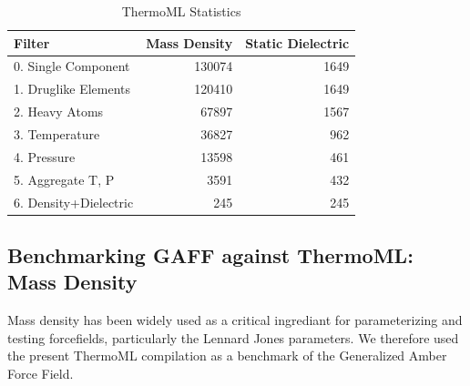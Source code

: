 \documentclass[journal=jacsat,manuscript=article]{achemso}
\begin{document}
\begin{table}
\begin{tabular}{lrr}
\toprule
Filter &  Mass Density &  Static Dielectric \\
\midrule
0.  Single Component   &               130074 &                                     1649 \\
1.  Druglike Elements  &               120410 &                                     1649 \\
2.  Heavy Atoms        &                67897 &                                     1567 \\
3.  Temperature        &                36827 &                                      962 \\
4.  Pressure           &                13598 &                                      461 \\
5.  Aggregate T, P     &                 3591 &                                      432 \\
6.  Density+Dielectric &                  245 &                                      245 \\
\bottomrule
\end{tabular}
\label{Table:Measurements}
\caption{ThermoML Statistics}
\end{table}


\subsection{Benchmarking GAFF against ThermoML: Mass Density}

Mass density has been widely used as a critical ingrediant for parameterizing and testing forcefields, particularly the Lennard Jones parameters.  We therefore used the present ThermoML compilation as a benchmark of the Generalized Amber Force Field.  
\end{document}
